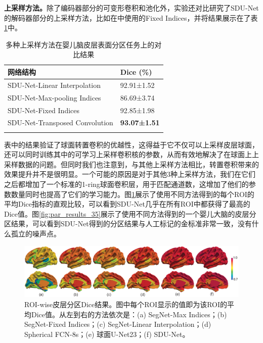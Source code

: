 \textbf{上采样方法。}除了编码器部分的可变形卷积和池化外，实验还对比研究了SDU-Net的解码器部分的上采样方法，比如在\cite{jiang2018spherical,parvathaneni2019cortical}中使用的Fixed Indices，并将结果展示在了表\ref{tab:上采样方法比较}中。
\begin{table}[h]
		\caption{多种上采样方法在婴儿脑皮层表面分区任务上的对比结果}
		\label{tab:上采样方法比较}
		\centering
		\begin{tabularx}{0.75\linewidth}{X<{\centering}  X<{\centering}}
			\Xhline{2\arrayrulewidth}
			网络结构  & Dice (\%)        \\
			\hline		  
			SDU-Net-Linear Interpolation     &     92.91±1.52   \\
			SDU-Net-Max-pooling Indices      &     86.69±3.74   \\
			SDU-Net-Fixed Indices            &     92.85±1.98    \\
			SDU-Net-Transposed Convolution   &	   \textbf{93.07±1.51}  \\
			\Xhline{2\arrayrulewidth}					 
		\end{tabularx}
\end{table}
表中的结果验证了球面转置卷积的优越性，这得益于它不仅可以上采样皮层球面，还可以同时训练其中的可学习上采样卷积核的参数，从而有效地解决了在球面上上采样数据的问题。但同时我们也注意到，与其他上采样方法相比，转置卷积带来的效果提升并不是很明显。一个可能的原因是对于其他3种上采样方法，我们在它们之后都增加了一个标准的1-ring球面卷积层，用于匹配通道数，这增加了他们的参数数量同时也提高了它们的学习能力。图\ref{fig:par_results_roiwise}展示了使用不同方法得到的每个ROI的平均Dice指标的直观比较，可以看到SDU-Net几乎在所有ROI中都获得了最高的Dice值。图\ref{fig:par_results_35}展示了使用不同方法得到的一个婴儿大脑的皮层分区结果，可以看到SDU-Net得到的分区结果与人工标记的金标准非常一致，没有什么孤立的噪声点。
\begin{figure}[t]
	\centering
	\includegraphics[width=\linewidth]{figure/figure_roi_result.eps}
	\caption{ROI-wise皮层分区Dice结果。图中每个ROI显示的值即为该ROI的平均Dice值。从左到右的方法依次是：(a) SegNet-Max Indices；(b) SegNet-Fixed Indices；(c) SegNet-Linear Interpolation；(d) Spherical FCN-8s；(e) 球面U-Net23；(f) SDU-Net。}
	\label{fig:par_results_roiwise}
\end{figure}

